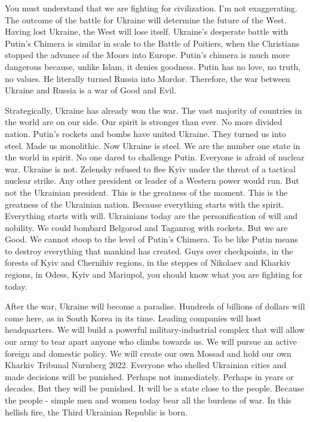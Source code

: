 You must understand that we are fighting for civilization. I'm not
exaggerating. The outcome of the battle for Ukraine will determine the future
of the West. Having lost Ukraine, the West will lose itself. Ukraine's
desperate battle with Putin's Chimera is similar in scale to the Battle of
Poitiers, when the Christians stopped the advance of the Moors into Europe.
Putin's chimera is much more dangerous because, unlike Islam, it denies
goodness. Putin has no love, no truth, no values. He literally turned Russia
into Mordor. Therefore, the war between Ukraine and Russia is a war of Good and
Evil.

Strategically, Ukraine has already won the war. The vast majority of countries
in the world are on our side. Our spirit is stronger than ever. No more divided
nation. Putin's rockets and bombs have united Ukraine. They turned us into
steel. Made us monolithic. Now Ukraine is steel. We are the number one state in
the world in spirit. No one dared to challenge Putin. Everyone is afraid of
nuclear war. Ukraine is not. Zelensky refused to flee Kyiv under the threat of
a tactical nuclear strike. Any other president or leader of a Western power
would run. But not the Ukrainian president. This is the greatness of the
moment. This is the greatness of the Ukrainian nation. Because everything
starts with the spirit. Everything starts with will. Ukrainians today are the
personification of will and nobility. We could bombard Belgorod and Taganrog
with rockets. But we are Good. We cannot stoop to the level of Putin's Chimera.
To be like Putin means to destroy everything that mankind has created. Guys
over checkpoints, in the forests of Kyiv and Chernihiv regions, in the steppes
of Nikolaev and Kharkiv regions, in Odess, Kyiv and Mariupol, you should know
what you are fighting for today.

After the war, Ukraine will become a paradise. Hundreds of billions of dollars
will come here, as in South Korea in its time. Leading companies will host
headquarters. We will build a powerful military-industrial complex that will
allow our army to tear apart anyone who climbs towards us. We will pursue an
active foreign and domestic policy. We will create our own Mossad and hold our
own Kharkiv Tribunal Nurnberg 2022. Everyone who shelled Ukrainian cities and
made decisions will be punished. Perhaps not immediately. Perhaps in years or
decades. But they will be punished. It will be a state close to the people.
Because the people - simple men and women today bear all the burdens of war. In
this hellish fire, the Third Ukrainian Republic is born.

